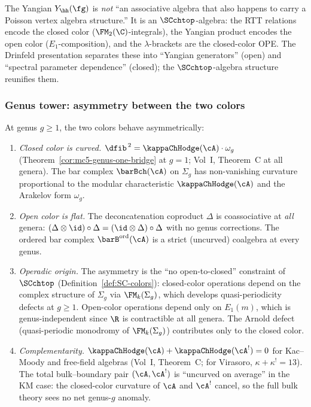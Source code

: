 \begin{remark}
The Yangian $Y_\hh(\fg)$ is \emph{not} ``an associative algebra
that also happens to carry a Poisson vertex algebra structure.''
It is an $\SCchtop$-algebra: the RTT relations encode the
closed color ($\FM_2(\C)$-integrals), the Yangian product
encodes the open color ($E_1$-composition), and the
$\lambda$-brackets are the closed-color OPE\@. The Drinfeld
presentation separates these into ``Yangian generators'' (open)
and ``spectral parameter dependence'' (closed); the
$\SCchtop$-algebra structure reunifies them.
\end{remark}

\subsubsection*{Genus tower: asymmetry between the two colors}

\begin{theorem}
At genus $g \ge 1$, the two colors behave asymmetrically:
\begin{enumerate}[label=\textup{(\roman*)}]
\item \emph{Closed color is curved.}
 $\dfib^{\,2} = \kappaChHodge(\cA) \cdot \omega_g$
 (Theorem~\ref{cor:mc5-genus-one-bridge} at $g=1$;
 Vol~I, Theorem~C at all genera). The bar complex
 $\barBch(\cA)$ on $\Sigma_g$ has non-vanishing curvature
 proportional to the modular characteristic $\kappaChHodge(\cA)$
 and the Arakelov form $\omega_g$.
\item \emph{Open color is flat.}
 The deconcatenation coproduct $\Delta$ is coassociative at
 \emph{all} genera: $(\Delta \otimes \id) \circ \Delta
 = (\id \otimes \Delta) \circ \Delta$ with no genus
 corrections. The ordered bar complex
 $\barB^{\mathrm{ord}}(\cA)$ is a strict
 (uncurved) coalgebra at every genus.
\item \emph{Operadic origin.}
 The asymmetry is the ``no open-to-closed'' constraint of
 $\SCchtop$ (Definition~\ref{def:SC-colors}): closed-color
 operations depend on the complex structure of $\Sigma_g$
 via $\FM_k(\Sigma_g)$, which develops quasi-periodicity
 defects at $g \ge 1$. Open-color operations
 depend only on $E_1(m)$, which is genus-independent since
 $\R$ is contractible at all genera. The Arnold defect
 (quasi-periodic monodromy of $\FM_k(\Sigma_g)$) contributes
 only to the closed color.
\item \emph{Complementarity.}
 $\kappaChHodge(\cA) + \kappaChHodge(\cA^!) = 0$ for Kac--Moody and free-field algebras
 (Vol~I, Theorem~C; for Virasoro, $\kappa + \kappa^! = 13$).
 The total bulk--boundary pair $(\cA, \cA^!)$
 is ``uncurved on average'' in the KM case: the closed-color curvature of
 $\cA$ and $\cA^!$ cancel, so the full bulk theory
 sees no net genus-$g$ anomaly.
\end{enumerate}
\end{theorem}

